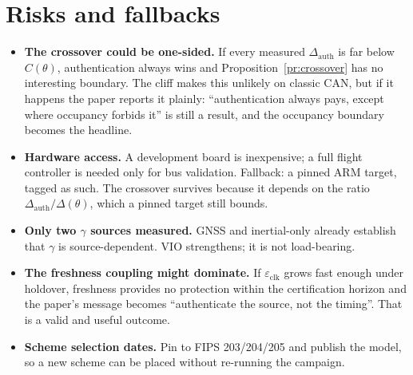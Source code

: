\documentclass[11pt,a4paper]{article}
\newcommand{\Dauth}{\Delta_{\mathrm{auth}}}
\newcommand{\eclk}{\varepsilon_{\mathrm{clk}}}
\begin{document}
\section{Risks and fallbacks}
\begin{itemize}
\item \textbf{The crossover could be one-sided.} If every measured $\Dauth$ is
  far below $C(\theta)$, authentication always wins and Proposition~\ref{pr:crossover}
  has no interesting boundary. The cliff makes this unlikely on classic CAN, but
  if it happens the paper reports it plainly: ``authentication always pays,
  except where occupancy forbids it'' is still a result, and the occupancy
  boundary becomes the headline.
\item \textbf{Hardware access.} A development board is inexpensive; a full flight
  controller is needed only for bus validation. Fallback: a pinned ARM target,
  tagged as such. The crossover survives because it depends on the ratio
  $\Dauth/\Delta(\theta)$, which a pinned target still bounds.
\item \textbf{Only two $\gamma$ sources measured.} GNSS and inertial-only already
  establish that $\gamma$ is source-dependent. VIO strengthens; it is not
  load-bearing.
\item \textbf{The freshness coupling might dominate.} If $\eclk$ grows fast
  enough under holdover, freshness provides no protection within the
  certification horizon and the paper's message becomes ``authenticate the
  source, not the timing''. That is a valid and useful outcome.
\item \textbf{Scheme selection dates.} Pin to FIPS 203/204/205 and publish the
  model, so a new scheme can be placed without re-running the campaign.
\end{itemize}

\end{document}
